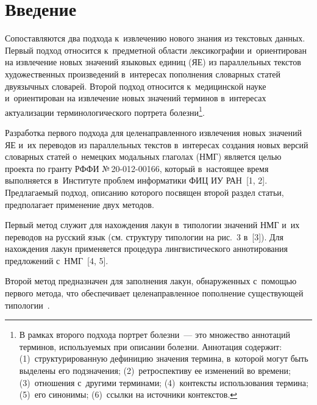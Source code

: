 



\thispagestyle{headings}

\begin{multicols}{2}

\label{st\stat}
  
\section{Введение}

  Сопоставляются два подхода к~извлечению нового знания из текстовых 
данных. Первый подход относится к~предметной области лексикографии 
и~ориентирован на извлечение новых значений языковых единиц (ЯЕ) из 
параллельных текстов художественных произведений в~интересах 
пополнения словарных статей двуязычных словарей. Второй подход 
относится к~медицинской науке и~ориентирован на извлечение новых 
значений терминов в~интересах актуализации терминологического портрета 
болезни\footnote[2]{В рамках второго подхода портрет болезни~--- это множество аннотаций 
терминов, используемых при описании болезни. Аннотация содержит: (1)~структурированную 
дефиницию значения термина, в~которой могут быть выделены его подзначения; 
(2)~ретроспективу ее изменений во времени; (3)~отношения с~другими терминами; (4)~контексты 
использования термина; (5)~его синонимы; (6)~ссылки на источники контекстов.}.
  
  Разработка первого подхода для целенаправленного извлечения новых 
значений ЯЕ и~их переводов из параллельных текстов 
в~интересах создания новых версий словарных статей о~немецких модальных 
глаголах (НМГ) является целью проекта по гранту РФФИ  
№\,20-012-00166, который в~настоящее время выполняется в~Институте 
проб\-лем информатики ФИЦ ИУ РАН~[1, 2]. Предлагаемый подход, 
описанию которого посвящен второй раздел статьи, предполагает 
применение двух методов. 

Первый метод служит для нахождения лакун 
в~типологии значений НМГ и~их переводов на русский язык (см. структуру 
типологии на рис.~3 в~[3]). Для нахождения лакун применяется процедура 
лингвистического аннотирования предложений с~НМГ~[4, 5]. 

Второй метод 
предназначен для заполнения лакун, обнаруженных с~помощью первого 
метода, что обеспечивает целенаправленное пополнение существующей 
типологии~\cite{5-z, 6-z}.


\end{multicols}
